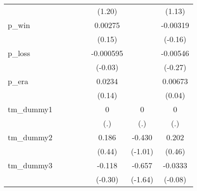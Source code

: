 {\begin{tabular}{l*{7}{c}}
            &                     &                     &                     &                     &      (1.20)         &                     &      (1.13)         \\
[1em]
p\_win       &                     &                     &                     &                     &     0.00275         &                     &    -0.00319         \\
            &                     &                     &                     &                     &      (0.15)         &                     &     (-0.16)         \\
[1em]
p\_loss      &                     &                     &                     &                     &   -0.000595         &                     &    -0.00546         \\
            &                     &                     &                     &                     &     (-0.03)         &                     &     (-0.27)         \\
[1em]
p\_era       &                     &                     &                     &                     &      0.0234         &                     &     0.00673         \\
            &                     &                     &                     &                     &      (0.14)         &                     &      (0.04)         \\
[1em]
tm\_dummy1   &                     &                     &                     &                     &           0         &           0         &           0         \\
            &                     &                     &                     &                     &         (.)         &         (.)         &         (.)         \\
[1em]
tm\_dummy2   &                     &                     &                     &                     &       0.186         &      -0.430         &       0.202         \\
            &                     &                     &                     &                     &      (0.44)         &     (-1.01)         &      (0.46)         \\
[1em]
tm\_dummy3   &                     &                     &                     &                     &      -0.118         &      -0.657         &     -0.0333         \\
            &                     &                     &                     &                     &     (-0.30)         &     (-1.64)         &     (-0.08)         \\

\end{tabular}}
